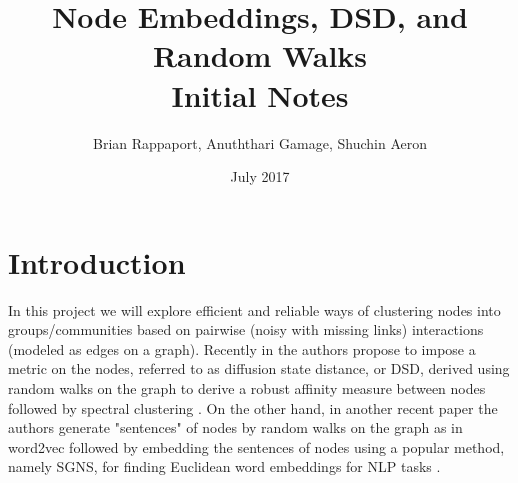 \documentclass{article}
\title{Node Embeddings, DSD, and Random Walks \\ \large{Initial Notes}}
\author{Brian Rappaport, Anuththari Gamage, Shuchin Aeron }
\date{July 2017}
\begin{document}
\maketitle

\section{Introduction}

In this project we will explore efficient and reliable ways of clustering nodes into groups/communities based on pairwise (noisy with missing links) interactions (modeled as edges on a graph). Recently in \cite{DSD} the authors propose to impose a metric on the nodes, referred to as diffusion state distance, or DSD, derived using random walks on the graph to derive a robust affinity measure between nodes followed by spectral clustering \cite{Luxburg}. On the other hand, in another recent paper \cite{NodeEmbed} the authors generate "sentences" of nodes by random walks on the graph as in word2vec \cite{word2vec} followed by embedding the sentences of nodes using a popular method, namely SGNS, for finding Euclidean word embeddings for NLP tasks \cite{LevyGoldberg}.
\end{document}
